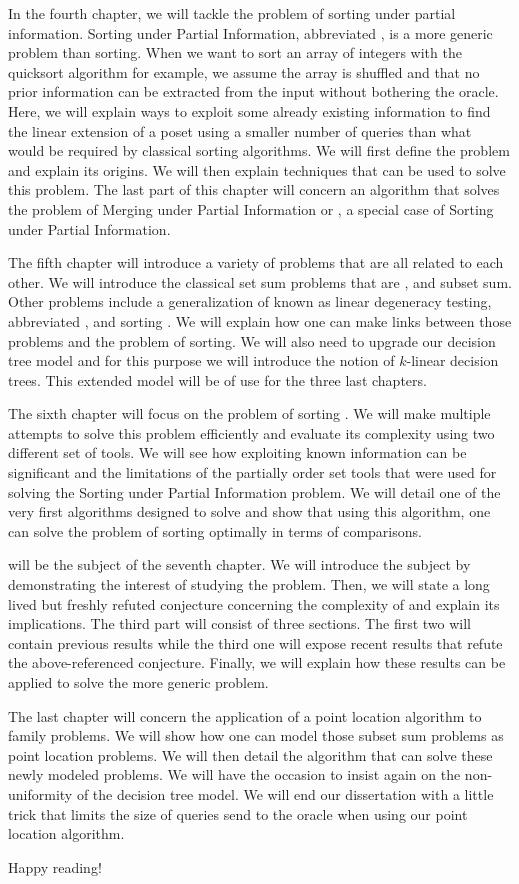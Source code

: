 In the fourth chapter, we will tackle the problem of sorting under partial
information. Sorting under Partial Information, abbreviated , is
a more generic problem than sorting. When we want to sort an array of integers
with the quicksort algorithm for example, we assume the array is shuffled and
that no prior information can be extracted from the input without bothering the
oracle. Here, we will explain ways to exploit some already existing information
to find the linear extension of a poset using a smaller number of queries than
what would be required by classical sorting algorithms. We will first define
the problem and explain its origins. We will then explain techniques that can
be used to solve this problem. The last part of this chapter will concern an
algorithm that solves the problem of Merging under Partial Information or
, a special case of Sorting under Partial Information.

The fifth chapter will introduce a variety of problems that are all related to
each other. We will introduce the classical set sum problems that are
\threeSUM, \kSUM and subset sum. Other problems include a generalization of
\kSUM known as linear degeneracy testing, abbreviated \kLDT, and sorting \XY.
We will explain how one can make links between those problems and the problem
of sorting. We will also need to upgrade our decision tree model and for this
purpose we will introduce the notion of \(k\)-linear decision trees. This
extended model will be of use for the three last chapters.

The sixth chapter will focus on the problem of sorting \XY. We will make
multiple attempts to solve this problem efficiently and evaluate its complexity
using two different set of tools. We will see how exploiting known information
can be significant and the limitations of the partially order set tools that
were used for solving the Sorting under Partial Information problem. We will
detail one of the very first algorithms designed to solve  and
show that using this algorithm, one can solve the problem of sorting \XY
optimally in terms of comparisons.

\threeSUM will be the subject of the seventh chapter. We will introduce the
subject by demonstrating the interest of studying the \threeSUM problem. Then,
we will state a long lived but freshly refuted conjecture concerning the
complexity of \threeSUM and explain its implications. The third part will
consist of three sections. The first two will contain previous results while
the third one will expose recent results that refute the above-referenced
conjecture. Finally, we will explain how these results can be applied to solve
the more generic \kLDT problem.

The last chapter will concern the application of a point location algorithm to
\kSUM family problems. We will show how one can model those subset sum
problems as point location problems. We will then detail the algorithm that
can solve these newly modeled problems. We will have the occasion to insist again
on the non-uniformity of the decision tree model. We will end our dissertation
with a little trick that limits the size of queries send to the oracle when
using our point location algorithm.

Happy reading!
